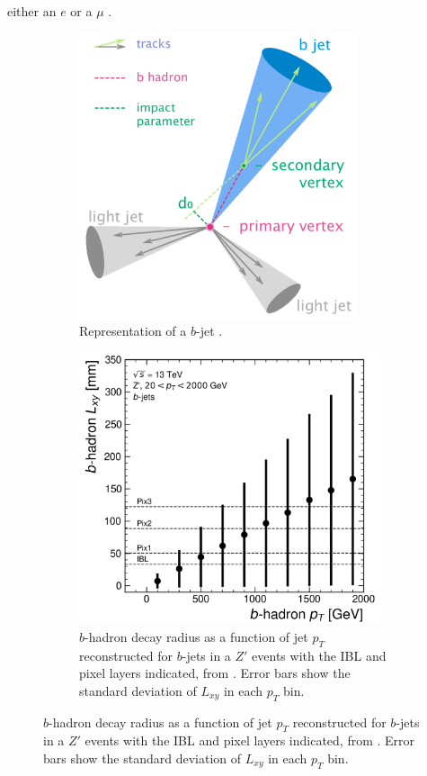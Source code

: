either an $e$ or a $\mu$ \cite{Tanabashi:2018oca}. \\

\begin{figure}[h!]
\center
\begin{subfigure}[b]{0.48\textwidth}
  \centering
  \includegraphics[width=0.9\textwidth]{Images/bjet}
  \caption{Representation of a $b$-jet \cite{bjetimage}.}
  \label{fig:bjet}
\end{subfigure}
\begin{subfigure}[b]{0.49\textwidth}
  \centering
  \includegraphics[width=0.98\textwidth]{Images/FTAG/intro/bhaddecay.png}
  \caption{$b$-hadron decay radius as a function of jet $p_T$ reconstructed for $b$-jets in a $Z'$ events with the IBL and pixel layers indicated, from \cite{VanStroud:2869719}. Error bars show the standard deviation of $L_{xy}$ in each $p_T$ bin.} 
  \label{fig:bhaddecay}
\end{subfigure}
\end{figure}

